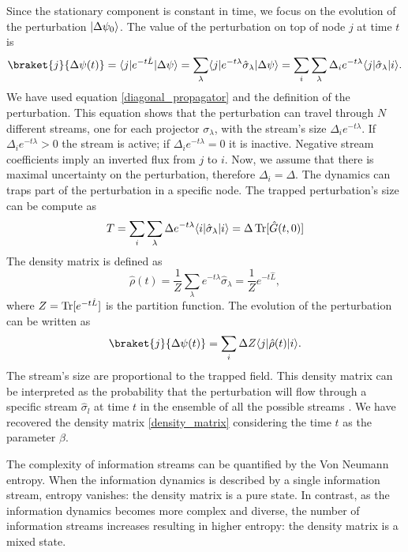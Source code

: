 Since the stationary component is constant in time, we focus on the evolution of the perturbation $\lvert\Delta\psi_0\rangle$. 
The value of the perturbation on top of node $j$ at time $t$ is
\begin{equation}
    \braket{j}{\Delta\psi(t)} = \bra{j} e^{-t\hat L} \ket{\Delta\psi} =\sum_\lambda \bra{j} e^{-t\lambda} \hat \sigma_\lambda\ket{\Delta\psi} = \sum_i  \sum_\lambda \Delta_i e^{-t\lambda} \bra{j}  \hat \sigma_\lambda \ket{i}.
\end{equation}
We have used equation \eqref{diagonal_propagator} and the definition of the perturbation.
This equation shows that the perturbation can travel through $N$ different streams, one for each projector $\sigma_\lambda$, with the stream's size $\Delta_i e^{-t\lambda}$. If $\Delta_i e^{-t\lambda} > 0$ the stream is active; if $\Delta_i e^{-t\lambda} = 0$ it is inactive. Negative stream coefficients imply an inverted flux from $j$ to $i$.
Now, we assume that there is maximal uncertainty on the perturbation, therefore $\Delta_i = \Delta$.
The dynamics can traps part of the perturbation in a specific node. The trapped perturbation's size can be compute as
\begin{equation}\label{T_equation}
    T = \sum_i  \sum_\lambda \Delta e^{-t\lambda} \langle i\rvert  \hat \sigma_\lambda \lvert i\rangle = \Delta \operatorname{Tr} [\hat G(t,0)]
\end{equation} 
The density matrix is defined as
\begin{equation}
    \hat\rho(t) = \frac{1}{Z}\sum_\lambda  e^{-t\lambda} \hat \sigma_\lambda = \frac{1}{Z} e^{-t\hat L},
\end{equation}
where $Z = \operatorname{Tr}[e^{-t\hat L}] $ is the partition function.
The evolution of the perturbation can be written as
\begin{equation}
    \braket{j}{\Delta\psi(t)} = \sum_i \Delta Z \bra{j}\hat\rho(t) \ket{i}.
\end{equation}
The stream's size are proportional to the trapped field.
This density matrix can be interpreted as the probability that the perturbation will flow through a specific stream $\hat \sigma_l$ at time $t$ in the ensemble of all the possible streams \cite{De_Domenico_2020}. We have recovered the density matrix \eqref{density_matrix} considering the time $t$ as the parameter $\beta$.

The complexity of information streams can be quantified by the Von Neumann entropy.
When the information dynamics is described by a single information stream, entropy vanishes: the density matrix is a pure state.
In contrast, as the information dynamics becomes more complex and diverse, the number of information streams increases resulting in higher entropy: the density matrix is a mixed state.

